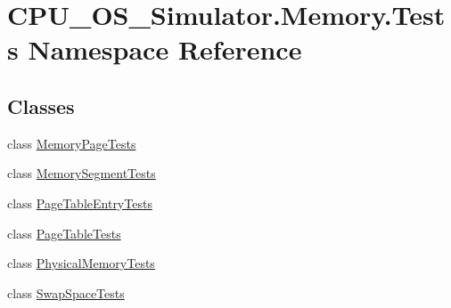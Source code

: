 \hypertarget{namespace_c_p_u___o_s___simulator_1_1_memory_1_1_tests}{}\section{C\+P\+U\+\_\+\+O\+S\+\_\+\+Simulator.\+Memory.\+Tests Namespace Reference}
\label{namespace_c_p_u___o_s___simulator_1_1_memory_1_1_tests}
\subsection*{Classes}
\begin{DoxyCompactItemize}
\item 
class \hyperlink{class_c_p_u___o_s___simulator_1_1_memory_1_1_tests_1_1_memory_page_tests}{Memory\+Page\+Tests}
\item 
class \hyperlink{class_c_p_u___o_s___simulator_1_1_memory_1_1_tests_1_1_memory_segment_tests}{Memory\+Segment\+Tests}
\item 
class \hyperlink{class_c_p_u___o_s___simulator_1_1_memory_1_1_tests_1_1_page_table_entry_tests}{Page\+Table\+Entry\+Tests}
\item 
class \hyperlink{class_c_p_u___o_s___simulator_1_1_memory_1_1_tests_1_1_page_table_tests}{Page\+Table\+Tests}
\item 
class \hyperlink{class_c_p_u___o_s___simulator_1_1_memory_1_1_tests_1_1_physical_memory_tests}{Physical\+Memory\+Tests}
\item 
class \hyperlink{class_c_p_u___o_s___simulator_1_1_memory_1_1_tests_1_1_swap_space_tests}{Swap\+Space\+Tests}
\end{DoxyCompactItemize}
